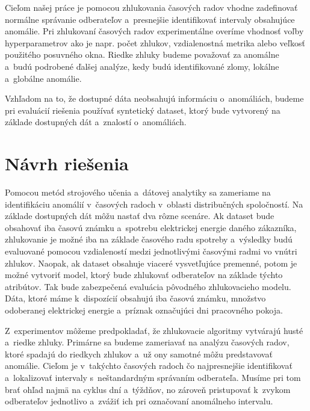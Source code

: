 \documentclass[a4paper,twoside,slovak,12pt,appendix]{article}
\begin{document}
Cieľom našej práce je pomocou zhlukovania časových radov vhodne zadefinovať
normálne správanie odberateľov a~presnejšie identifikovať intervaly obsahujúce
anomálie. Pri zhlukovaní časových radov experimentálne overíme vhodnosť voľby
hyperparametrov ako je napr. počet zhlukov, vzdialenostná metrika alebo veľkosť
použitého posuvného okna. Riedke zhluky budeme považovať za anomálne a~budú
podrobené ďalšej analýze, kedy budú identifikované zlomy, lokálne a~globálne
anomálie.

Vzhľadom na to, že dostupné dáta neobsahujú informáciu o~anomáliách, budeme pri
evaluácií riešenia používať syntetický dataset, ktorý bude vytvorený na základe
dostupných dát a~znalostí o~anomáliách.


\newpage
\section{Návrh riešenia}
\label{c:solution-design}
Pomocou metód strojového učenia a~dátovej analytiky sa zameriame na
identifikáciu anomálií v~časových radoch v~oblasti distribučných spoločností. Na
základe dostupných dát môžu nastať dva rôzne scenáre. Ak dataset bude obsahovať
iba časovú známku a~spotrebu elektrickej energie daného zákazníka, zhlukovanie
je možné iba na základe časového radu spotreby a~výsledky budú evaluované
pomocou vzdialeností medzi jednotlivými časovými radmi vo vnútri zhlukov.
Naopak, ak dataset obsahuje viaceré vysvetľujúce premenné, potom je možné
vytvoriť model, ktorý bude zhlukovať odberateľov na základe týchto atribútov.
Tak bude zabezpečená evaluácia pôvodného zhlukovacieho modelu. Dáta, ktoré máme
k~dispozícií obsahujú iba časovú známku, množstvo odoberanej elektrickej energie
a~príznak označujúci dni pracovného pokoja.

Z~experimentov môžeme predpokladať, že zhlukovacie algoritmy vytvárajú husté
a~riedke zhluky. Primárne sa budeme zameriavať na analýzu časových radov,
ktoré spadajú do riedkych zhlukov a~už ony samotné môžu predstavovať anomálie.
Cieľom je v~takýchto časových radoch čo najpresnejšie identifikovať
a~lokalizovať intervaly s~neštandardným správaním odberateľa. Musíme pri tom
brať ohľad najmä na cyklus dní a~týždňov, no zároveň pristupovať k~zvykom
odberateľov jednotlivo a~zvážiť ich pri označovaní anomálneho intervalu.
\end{document}
